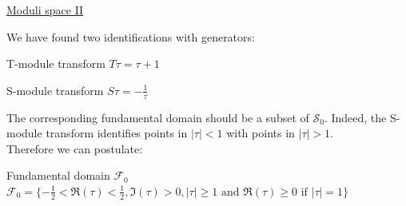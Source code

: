 \documentclass[11pt,aspectratio=169]{beamer}
\begin{document}
\begin{frame}{\underline{Moduli space II}}

	We have found two identifications with generators:
	\begin{block}{T-module transform}
		$T\tau = \tau + 1$
	\end{block}
	\begin{block}{S-module transform}
		$S\tau = -\frac{1}{\tau}$
	\end{block}
	The corresponding fundamental domain should be a subset of $\mathcal{S}_{0}$. Indeed, the S-module transform identifies points in $|\tau| < 1$ with points in $|\tau| > 1$.
	\\
	Therefore we can postulate:
	\begin{block}{Fundamental domain $\mathcal{F}_{0}$}
		$\mathcal{F}_{0} = \{-\frac{1}{2} < \Re(\tau) < \frac{1}{2}, \Im(\tau) > 0, |\tau| \geq 1 \textrm{ and } \Re(\tau) \geq 0 \textrm{ if } |\tau| = 1\}$
	\end{block}
	
\end{frame}
\end{document}
